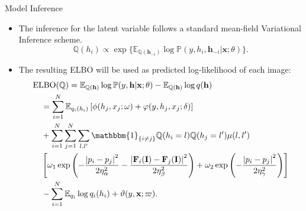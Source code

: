 \documentclass[leqno]{beamer}
\newcommand{\EE}{{\mathbb{E}}}
\newcommand{\PP}{{\mathbb{P}}}
\newcommand{\QQ}{{\mathbb{Q}}}
\newcommand{\Fb}{\mathbf{F}}
\newcommand{\Ib}{\mathbf{I}}
\newcommand{\hb}{\mathbf{h}}
\newcommand{\xb}{\mathbf{x}}
\newcommand{\one}{\mathbbm{1}}
\begin{document}
\begin{frame}{Model Inference}
\begin{small}
\begin{itemize}
\item The inference for the latent variable follows a standard mean-field
Variational Inference scheme.
\begin{equation*}
\QQ(h_i) \propto \exp\{\EE_{\QQ(\hb_{-i})}
\log\PP(y, h_i, \hb_{-i} \vert \xb; \theta)\}.
\end{equation*}
\item The resulting ELBO will be used as predicted log-likelihood of each image:
\begin{equation*}
\begin{split}
& \textrm{ELBO}(\QQ) = \EE_{\QQ(\hb)} \log\PP(y, \hb \vert \xb; \theta)
- \EE_{\QQ(\hb)} \log q(\hb) \\
&\quad = \sum_{i=1}^N \EE_{q_i(h_i)}
\left[ \phi(h_j, x_j; \omega) + \varphi(y, h_j, x_j; \delta) \right] \\
&\quad + \sum_{i=1}^N \sum_{j=1}^N \sum_{l,l^\prime} \one_{\{i \neq j\}} 
\QQ(h_i = l) \QQ(h_j = l^\prime) \mu(l, l^\prime) \\
&\quad \left[ \omega_1 \exp \left(
- \frac{\left\lvert p_i - p_j \right\rvert^2}{2\eta_\alpha^2}
- \frac{\left\lvert \Fb_i(\Ib) - \Fb_j(\Ib) \right\rvert^2}{2\eta_\beta^2}
\right) + \omega_2 \exp \left(
- \frac{\left\lvert p_i - p_j \right\rvert^2}{2\eta_\gamma^2}
\right) \right] \\
&\quad - \sum_{i=1}^N \EE_{q_i} \log q_i(h_i) + \vartheta(y, \xb; 
\varpi).
\end{split}
\end{equation*}
\end{itemize}
\end{small}
\end{frame}





%
%
\end{document}
